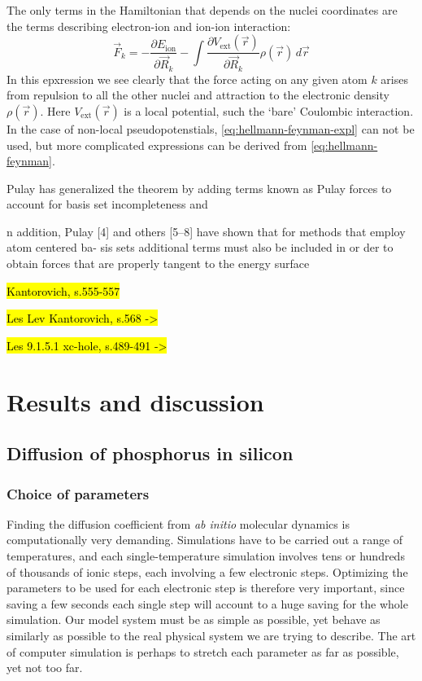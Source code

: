 \documentclass[11pt,bibliography=totoc,index=totoc]{scrbook}   %
\newcommand{\comment}[1]{\hl{#1}}
\begin{document}
The only terms in the Hamiltonian that depends on the nuclei coordinates are the terms describing
electron-ion and ion-ion interaction:
\begin{equation}
  \vec{F}_k = - \frac{\partial E_{\text{ion}}}{\partial\vec{R}_k} - \int \frac{\partial V_{\text{ext}}(\vec{r})}{\partial\vec{R}_k} \rho(\vec{r}) \,d\vec{r}
  \label{eq:hellmann-feynman-expl}
\end{equation}
In this epxression we see clearly that the force acting on any given atom $k$ arises from repulsion to all the other nuclei and attraction to the electronic density $\rho(\vec{r})$. Here $V_{\text{ext}}(\vec{r})$ is a local potential, such the `bare' Coulombic interaction. 
In the case of non-local pseudopotenstials, \eqref{eq:hellmann-feynman-expl} can not be used, but more complicated expressions can be derived from \eqref{eq:hellmann-feynman}.



Pulay\cite{Pulay:1969} has generalized the theorem by adding terms known as Pulay forces to account
for basis set incompleteness and 

n addition, Pulay [4] and others [5–8] have shown that for methods that employ atom centered ba- sis sets additional terms must also be included in or
der to obtain forces that are properly tangent to the energy surface


\comment{Kantorovich, s.555-557}

\comment{Les Lev Kantorovich, s.568 ->}

\comment{Les 9.1.5.1 xc-hole, s.489-491 ->}






\part{Results and discussion}

\chapter{Diffusion of phosphorus in silicon}

\section{Choice of parameters}

Finding the diffusion coefficient from \textit{ab initio} molecular dynamics is computationally very demanding.
Simulations have to be carried out a range of temperatures, and each single-temperature simulation involves tens or hundreds of thousands of ionic steps, each involving a few electronic steps. 
Optimizing the parameters to be used for each electronic step is therefore very important, since saving a few seconds each single step will account to a huge saving for the whole simulation. 
Our model system must be as simple as possible, yet behave as similarly as possible to the real physical system we are trying to describe. 
The art of computer simulation is perhaps to stretch each parameter as far as possible, yet not too far. 
\end{document}
